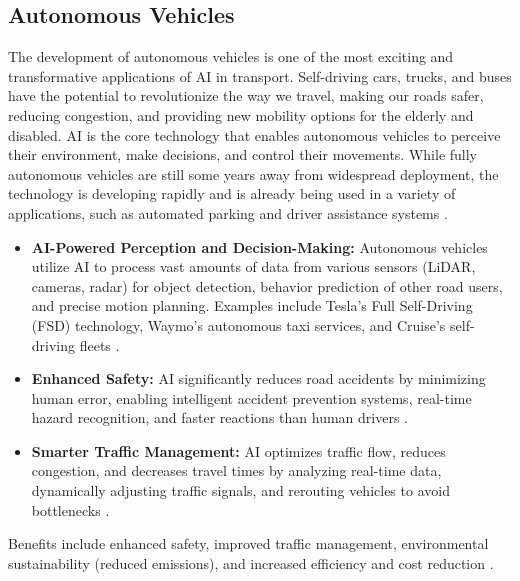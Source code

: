 \subsection{Autonomous Vehicles}
The development of autonomous vehicles is one of the most exciting and transformative applications of AI in transport. Self-driving cars, trucks, and buses have the potential to revolutionize the way we travel, making our roads safer, reducing congestion, and providing new mobility options for the elderly and disabled. AI is the core technology that enables autonomous vehicles to perceive their environment, make decisions, and control their movements. While fully autonomous vehicles are still some years away from widespread deployment, the technology is developing rapidly and is already being used in a variety of applications, such as automated parking and driver assistance systems \cite{ma2020review}.
\begin{itemize}
    \item \textbf{AI-Powered Perception and Decision-Making:} Autonomous vehicles utilize AI to process vast amounts of data from various sensors (LiDAR, cameras, radar) for object detection, behavior prediction of other road users, and precise motion planning. Examples include Tesla's Full Self-Driving (FSD) technology, Waymo's autonomous taxi services, and Cruise's self-driving fleets \cite{AppliedAICourse_AV, Artiba_AV}.
    \item \textbf{Enhanced Safety:} AI significantly reduces road accidents by minimizing human error, enabling intelligent accident prevention systems, real-time hazard recognition, and faster reactions than human drivers \cite{DebutInfotech_AV, Sapien_AV}.
    \item \textbf{Smarter Traffic Management:} AI optimizes traffic flow, reduces congestion, and decreases travel times by analyzing real-time data, dynamically adjusting traffic signals, and rerouting vehicles to avoid bottlenecks \cite{Numalis_AV, AppInventiv_AV}.
\end{itemize}
Benefits include enhanced safety, improved traffic management, environmental sustainability (reduced emissions), and increased efficiency and cost reduction \cite{OyeLabs_AV, HashStudioz_AV}.

